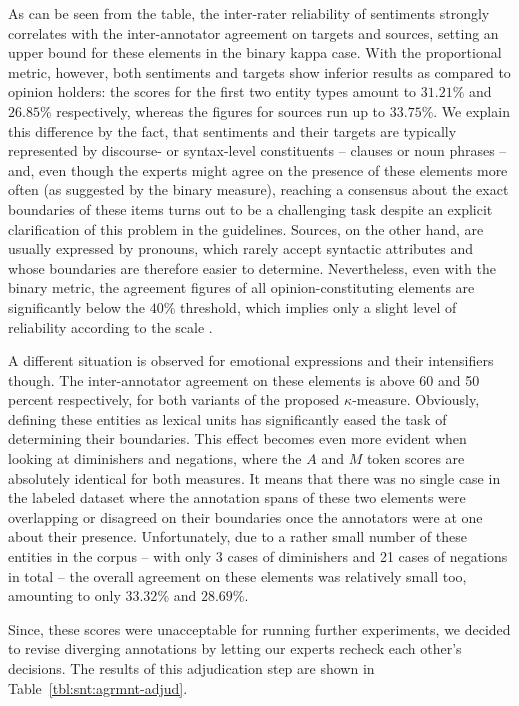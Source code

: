 As can be seen from the table, the inter-rater reliability of
sentiments strongly correlates with the inter-annotator agreement on
targets and sources, setting an upper bound for these elements in the
binary kappa case.  With the proportional metric, however, both
sentiments and targets show inferior results as compared to opinion
holders: the scores for the first two entity types amount to $31.21\%$
and $26.85\%$ respectively, whereas the figures for sources run up to
$33.75\%$.  We explain this difference by the fact, that sentiments
and their targets are typically represented by discourse- or
syntax-level constituents -- clauses or noun phrases -- and, even
though the experts might agree on the presence of these elements more
often (as suggested by the binary measure), reaching a consensus about
the exact boundaries of these items turns out to be a challenging task
despite an explicit clarification of this problem in the guidelines.
Sources, on the other hand, are usually expressed by pronouns, which
rarely accept syntactic attributes and whose boundaries are therefore
easier to determine.  Nevertheless, even with the binary metric, the
agreement figures of all opinion-constituting elements are
significantly below the $40\%$ threshold, which implies only a slight
level of reliability according to the \citeauthor{Landis:77} scale
\cite{Landis:77}.

A different situation is observed for emotional expressions and their
intensifiers though.  The inter-annotator agreement on these elements
is above 60 and 50 percent respectively, for both variants of the
proposed $\kappa$-measure.  Obviously, defining these entities as
lexical units has significantly eased the task of determining their
boundaries.  This effect becomes even more evident when looking at
diminishers and negations, where the $A$ and $M$ token scores are
absolutely identical for both measures.  It means that there was no
single case in the labeled dataset where the annotation spans of these
two elements were overlapping or disagreed on their boundaries once
the annotators were at one about their presence.  Unfortunately, due
to a rather small number of these entities in the corpus -- with only
3 cases of diminishers and 21 cases of negations in total -- the
overall agreement on these elements was relatively small too,
amounting to only $33.32\%$ and $28.69\%$.

Since, these scores were unacceptable for running further experiments,
we decided to revise diverging annotations by letting our experts
recheck each other's decisions.
The results of this adjudication step are shown in
Table~\ref{tbl:snt:agrmnt-adjud}.

